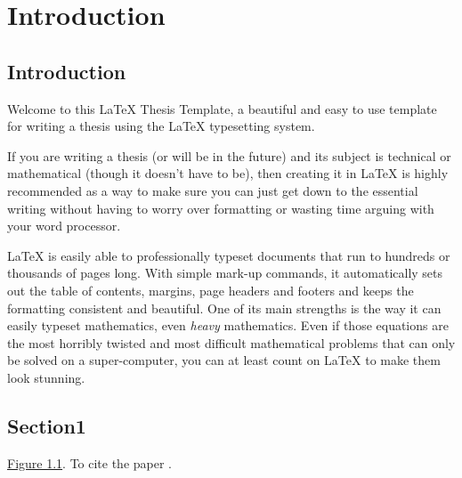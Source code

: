 \documentclass[thesis.tex]{subfiles}
\begin{document}
\newpage
\setcounter{chapter}{0} %


  
\thispagestyle{empty}

\chapter{Introduction}\label{chap1:introduction}
\section{Introduction}

Welcome to this \LaTeX{} Thesis Template, a beautiful and easy to use template for writing a thesis using the \LaTeX{} typesetting system.

If you are writing a thesis (or will be in the future) and its subject is technical or mathematical (though it doesn't have to be), then creating it in \LaTeX{} is highly recommended as a way to make sure you can just get down to the essential writing without having to worry over formatting or wasting time arguing with your word processor.

\LaTeX{} is easily able to professionally typeset documents that run to hundreds or thousands of pages long. With simple mark-up commands, it automatically sets out the table of contents, margins, page headers and footers and keeps the formatting consistent and beautiful. One of its main strengths is the way it can easily typeset mathematics, even \emph{heavy} mathematics. Even if those equations are the most horribly twisted and most difficult mathematical problems that can only be solved on a super-computer, you can at least count on \LaTeX{} to make them look stunning.

\section{Section1}
   \lipsum[1] \hyperref[1figure1]{Figure 1.1}. 
To cite the paper \cite{mukherjee2024heat}.
\end{document}
